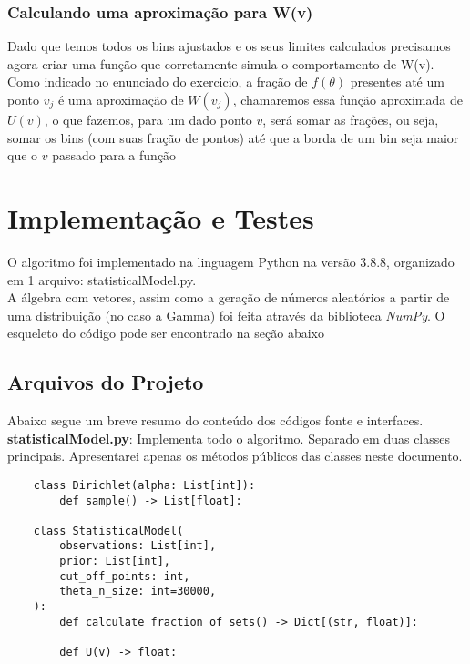 \documentclass[twocolumn,amsmath,amssymb,floatfix]{revtex4}
\begin{document}
\subsubsection{Calculando uma aproximação para W(v)}
\indent Dado que temos todos os bins ajustados e os seus limites calculados precisamos agora criar uma função que corretamente simula o comportamento de W(v). \\ 
\indent Como indicado no enunciado do exercicio, a fração de $f(\theta)$ presentes até um ponto $v_j$ é uma aproximação de $W(v_j)$, chamaremos essa função aproximada de $U(v)$, o que fazemos, para um dado ponto $v$, será somar as frações, ou seja, somar os bins (com suas fração de pontos) até que a borda de um bin seja maior que o $v$ passado para a função
\section{Implementação e Testes}
\indent O algoritmo foi implementado na linguagem Python na versão 3.8.8, organizado em 1 arquivo: statisticalModel.py. \\
\indent A álgebra com vetores, assim como a geração de números aleatórios a partir de uma distribuição (no caso a Gamma) foi feita através da biblioteca \textit{NumPy}. O esqueleto do código pode ser encontrado na seção abaixo 
\subsection{Arquivos do Projeto}
\indent Abaixo segue um breve resumo do conteúdo dos códigos fonte e interfaces.
\indent \textbf{statisticalModel.py}: Implementa todo o algoritmo. Separado em duas classes principais. Apresentarei apenas os métodos públicos das classes neste documento.
\begin{lstlisting}
    class Dirichlet(alpha: List[int]):
        def sample() -> List[float]:

    class StatisticalModel(
        observations: List[int],
        prior: List[int],
        cut_off_points: int,
        theta_n_size: int=30000,
    ):
        def calculate_fraction_of_sets() -> Dict[(str, float)]:
        
        def U(v) -> float:
\end{lstlisting}
\end{document}
